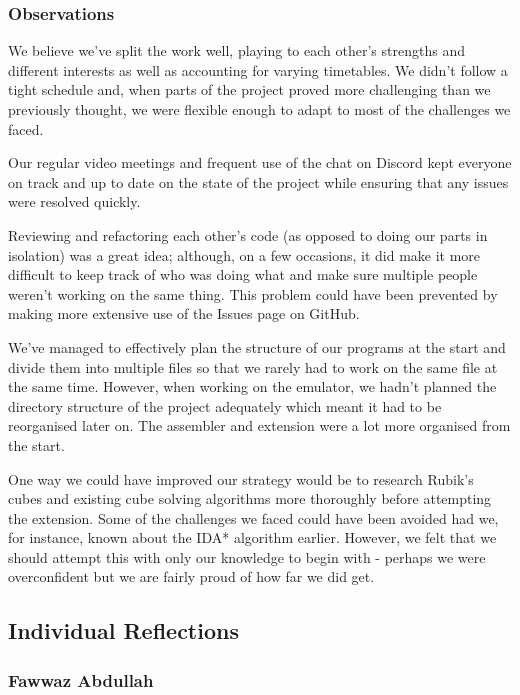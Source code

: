 \documentclass[8pt]{article}
\begin{document}
\subsubsection{Observations}

We believe we've split the work well, playing to each other's strengths and different interests
as well as accounting for varying timetables. We didn't follow a tight schedule and,
when parts of the project proved more challenging than we previously thought, we were
flexible enough to adapt to most of the challenges we faced.

Our regular video meetings and frequent use of the chat on Discord kept everyone on track
and up to date on the state of the project while ensuring that any issues were resolved quickly.

Reviewing and refactoring each other's code (as opposed to doing our parts in isolation) was
a great idea; although, on a few occasions, it did make it more difficult to keep track of 
who was doing what and make sure multiple people weren't working on the same thing.
This problem could have been prevented by making more extensive use of the Issues page
on GitHub.

We've managed to effectively plan the structure of our programs at the start and divide them
into multiple files so that we rarely had to work on the same file at the same time.
However, when working on the emulator, we hadn't planned the directory structure of the project
adequately which meant it had to be reorganised later on. The assembler and extension were
a lot more organised from the start.

One way we could have improved our strategy would be to research Rubik's cubes and
existing cube solving algorithms more thoroughly before attempting the extension.
Some of the challenges we faced could have been avoided had we, for instance, known about
the IDA* algorithm earlier. However, we felt that we should attempt this with only our
knowledge to begin with - perhaps we were overconfident but we are fairly proud of how
far we did get.

\subsection{Individual Reflections}

\subsubsection{Fawwaz Abdullah}
\end{document}
